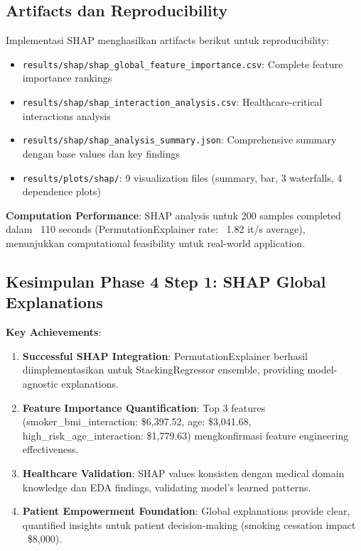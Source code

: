 \subsection{Artifacts dan Reproducibility}
\label{subsec:shap-artifacts}

Implementasi SHAP menghasilkan artifacts berikut untuk reproducibility:

\begin{itemize}
    \item \texttt{results/shap/shap\_global\_feature\_importance.csv}: Complete feature importance rankings
    \item \texttt{results/shap/shap\_interaction\_analysis.csv}: Healthcare-critical interactions analysis
    \item \texttt{results/shap/shap\_analysis\_summary.json}: Comprehensive summary dengan base values dan key findings
    \item \texttt{results/plots/shap/}: 9 visualization files (summary, bar, 3 waterfalls, 4 dependence plots)
\end{itemize}

\textbf{Computation Performance}: SHAP analysis untuk 200 samples completed dalam ~110 seconds (PermutationExplainer rate: ~1.82 it/s average), menunjukkan computational feasibility untuk real-world application.

\subsection{Kesimpulan Phase 4 Step 1: SHAP Global Explanations}
\label{subsec:shap-conclusions}

\textbf{Key Achievements}:
\begin{enumerate}
    \item \textbf{Successful SHAP Integration}: PermutationExplainer berhasil diimplementasikan untuk StackingRegressor ensemble, providing model-agnostic explanations.

    \item \textbf{Feature Importance Quantification}: Top 3 features (smoker\_bmi\_interaction: \$6,397.52, age: \$3,041.68, high\_risk\_age\_interaction: \$1,779.63) mengkonfirmasi feature engineering effectiveness.

    \item \textbf{Healthcare Validation}: SHAP values konsisten dengan medical domain knowledge dan EDA findings, validating model's learned patterns.

    \item \textbf{Patient Empowerment Foundation}: Global explanations provide clear, quantified insights untuk patient decision-making (smoking cessation impact ~\$8,000).
\end{enumerate}


